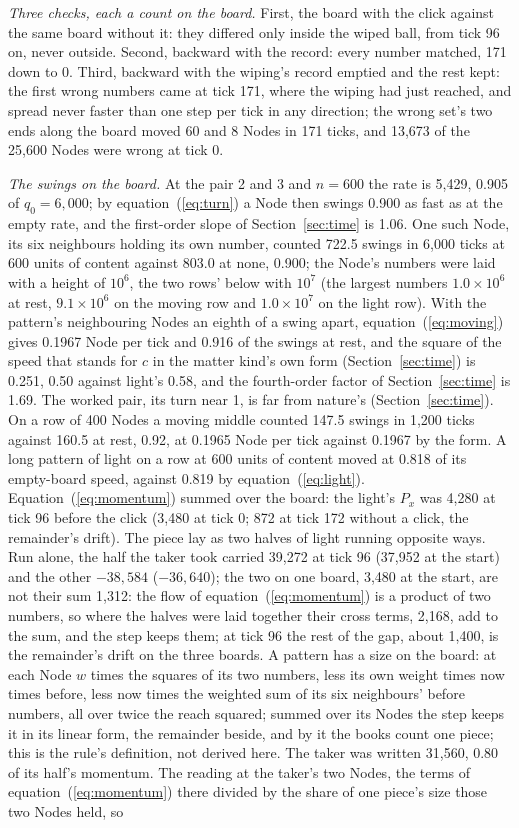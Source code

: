 \documentclass[pdflatex,sn-mathphys-num]{sn-jnl}
\begin{document}
\textit{Three checks, each a count on the board.} First, the board with the click against the same board without it: they differed only inside the wiped ball, from tick 96 on, never outside. Second, backward with the record: every number matched, 171 down to 0. Third, backward with the wiping's record emptied and the rest kept: the first wrong numbers came at tick 171, where the wiping had just reached, and spread never faster than one step per tick in any direction; the wrong set's two ends along the board moved 60 and 8 Nodes in 171 ticks, and 13,673 of the 25,600 Nodes were wrong at tick 0.

\textit{The swings on the board.} At the pair 2 and 3 and $n = 600$ the rate is 5,429, 0.905 of $q_0 = 6{,}000$; by equation~(\ref{eq:turn}) a Node then swings 0.900 as fast as at the empty rate, and the first-order slope of Section~\ref{sec:time} is 1.06. One such Node, its six neighbours holding its own number, counted 722.5 swings in 6,000 ticks at 600 units of content against 803.0 at none, 0.900; the Node's numbers were laid with a height of $10^6$, the two rows' below with $10^7$ (the largest numbers $1.0 \times 10^6$ at rest, $9.1 \times 10^6$ on the moving row and $1.0 \times 10^7$ on the light row). With the pattern's neighbouring Nodes an eighth of a swing apart, equation~(\ref{eq:moving}) gives 0.1967 Node per tick and 0.916 of the swings at rest, and the square of the speed that stands for $c$ in the matter kind's own form (Section~\ref{sec:time}) is 0.251, 0.50 against light's 0.58, and the fourth-order factor of Section~\ref{sec:time} is 1.69. The worked pair, its turn near 1, is far from nature's (Section~\ref{sec:time}). On a row of 400 Nodes a moving middle counted 147.5 swings in 1,200 ticks against 160.5 at rest, 0.92, at 0.1965 Node per tick against 0.1967 by the form. A long pattern of light on a row at 600 units of content moved at 0.818 of its empty-board speed, against 0.819 by equation~(\ref{eq:light}). Equation~(\ref{eq:momentum}) summed over the board: the light's $P_x$ was 4,280 at tick 96 before the click (3,480 at tick 0; 872 at tick 172 without a click, the remainder's drift). The piece lay as two halves of light running opposite ways. Run alone, the half the taker took carried 39,272 at tick 96 (37,952 at the start) and the other $-38{,}584$ ($-36{,}640$); the two on one board, 3,480 at the start, are not their sum 1,312: the flow of equation~(\ref{eq:momentum}) is a product of two numbers, so where the halves were laid together their cross terms, 2,168, add to the sum, and the step keeps them; at tick 96 the rest of the gap, about 1,400, is the remainder's drift on the three boards. A pattern has a size on the board: at each Node $w$ times the squares of its two numbers, less its own weight times now times before, less now times the weighted sum of its six neighbours' before numbers, all over twice the reach squared; summed over its Nodes the step keeps it in its linear form, the remainder beside, and by it the books count one piece; this is the rule's definition, not derived here. The taker was written 31,560, 0.80 of its half's momentum. The reading at the taker's two Nodes, the terms of equation~(\ref{eq:momentum}) there divided by the share of one piece's size those two Nodes held, so 
\end{document}
